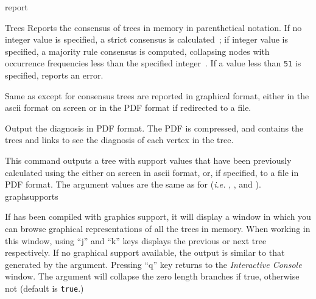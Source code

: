 \begin{command}{report}{}
\begin{arguments}
\begin{argumentgroup}{Trees}
                {Reports the consensus of trees in memory in parenthetical notation.
                If no integer value is
                specified, a strict consensus is calculated~\cite{rohlf1982};
                if integer value is specified,
                a majority rule consensus is computed, collapsing nodes with
                occurrence frequencies less than the specified integer~\cite{margush1981}.
                If a value less
                than \texttt{51} is specified, \poy reports an error.} 
                {}

                {Same as  except for consensus trees are
                reported in graphical format, either in the ascii format on
                screen or in the PDF format if redirected to a file.}
                {}

                {Output the diagnosis in PDF format. The PDF is compressed, and
                contains the trees and links to see the diagnosis of each vertex
                in the tree.}
                {}

                {This command outputs a tree with support values that have
                been previously calculated using the
                 either on screen
                in ascii format, or, if specified, to a file in PDF
                format. The argument values are the same as for 
                 (\emph{i.e.} ,
                , and ).} 
                {graphsupports}

                {If \poy has been compiled with graphics support, it 
                will display a window in which you can
                browse graphical representations of all the trees in memory.
                When working in this window, using ``j'' and ``k'' keys displays the
                previous or next tree respectively. If no graphical support available, the output 
                is similar to that generated by the  argument. Pressing ``q'' key 
                returns to the \emph{Interactive Console} window. The argument
                 will collapse the zero length branches if
                true, otherwise not (default is \texttt{true}.)} 
	     {}


\end{argumentgroup}
\end{arguments}
\end{command}
